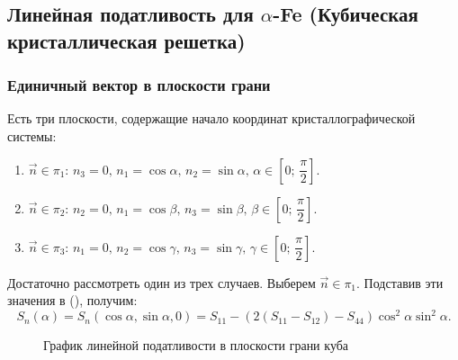 \documentclass[12pt,a4paper]{article}
\begin{document}
\subsection{Линейная податливость для $\alpha$-Fe (Кубическая кристаллическая решетка)}

\subsubsection{Единичный вектор в плоскости грани}

Есть три плоскости, содержащие начало координат кристаллографической системы:
\begin{enumerate}
	\item $\vec{n}\in \pi_1: \, n_3=0, \, n_1=\cos{\alpha}, \, n_2=\sin{\alpha}, \, \alpha \in \left[0; \, \dfrac{\pi}{2}\right]$.\\
	\item $\vec{n}\in \pi_2: \, n_2=0, \, n_1=\cos{\beta}, \, n_3=\sin{\beta}, \, \beta \in \left[0; \, \dfrac{\pi}{2}\right]$.\\
	\item $\vec{n}\in \pi_3: \, n_1=0, \, n_2=\cos{\gamma}, \, n_3=\sin{\gamma}, \, \gamma \in \left[0; \, \dfrac{\pi}{2}\right]$.\\
\end{enumerate}

Достаточно рассмотреть один из трех случаев. Выберем $\vec n \in \pi_1$. Подставив эти значения в (), получим:
\[
    S_n(\alpha) = S_n(\cos{\alpha},\sin{\alpha},0)=S_{11}-(2(S_{11}-S_{12})-S_{44}) \cos^2{\alpha} \sin^2{\alpha}.
\]

\pagebreak

\begin{figure}[h]
	\caption{График линейной податливости в плоскости грани куба}
	\label{pic:FeOpt}
\end{figure}
\end{document}
